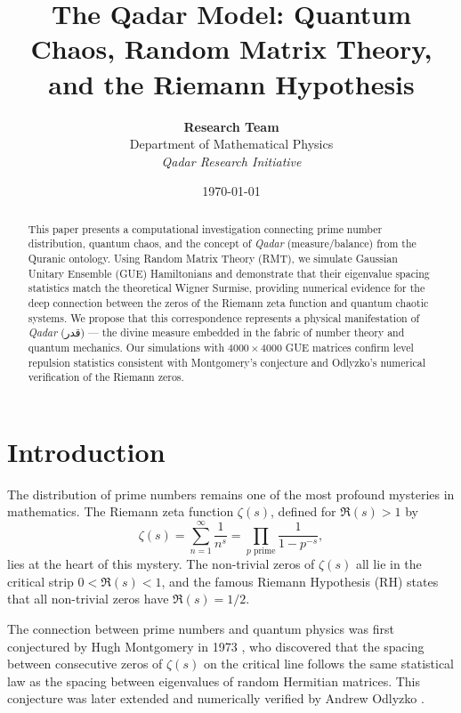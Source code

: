 \documentclass[12pt,a4paper]{article}
\title{\textbf{The Qadar Model: Quantum Chaos, Random Matrix Theory, and the Riemann Hypothesis}}
\author{
    \textbf{Research Team}\\[0.5em]
    Department of Mathematical Physics\\
    \textit{Qadar Research Initiative}
}
\date{\today}
\begin{document}
\maketitle

\begin{abstract}
This paper presents a computational investigation connecting prime number distribution, quantum chaos, and the concept of \textit{Qadar} (measure/balance) from the Quranic ontology. Using Random Matrix Theory (RMT), we simulate Gaussian Unitary Ensemble (GUE) Hamiltonians and demonstrate that their eigenvalue spacing statistics match the theoretical Wigner Surmise, providing numerical evidence for the deep connection between the zeros of the Riemann zeta function and quantum chaotic systems. We propose that this correspondence represents a physical manifestation of \textit{Qadar} (قدر) — the divine measure embedded in the fabric of number theory and quantum mechanics. Our simulations with $4000 \times 4000$ GUE matrices confirm level repulsion statistics consistent with Montgomery's conjecture and Odlyzko's numerical verification of the Riemann zeros.
\end{abstract}

\onehalfspacing

\section{Introduction}

The distribution of prime numbers remains one of the most profound mysteries in mathematics. The Riemann zeta function $\zeta(s)$, defined for $\Re(s) > 1$ by
\begin{equation}
\zeta(s) = \sum_{n=1}^{\infty} \frac{1}{n^s} = \prod_{p \text{ prime}} \frac{1}{1 - p^{-s}},
\end{equation}
lies at the heart of this mystery. The non-trivial zeros of $\zeta(s)$ all lie in the critical strip $0 < \Re(s) < 1$, and the famous Riemann Hypothesis (RH) states that all non-trivial zeros have $\Re(s) = 1/2$.

The connection between prime numbers and quantum physics was first conjectured by Hugh Montgomery in 1973 \cite{Montgomery1973}, who discovered that the spacing between consecutive zeros of $\zeta(s)$ on the critical line follows the same statistical law as the spacing between eigenvalues of random Hermitian matrices. This conjecture was later extended and numerically verified by Andrew Odlyzko \cite{Odlyzko1987, Odlyzko1989}.
\end{document}
